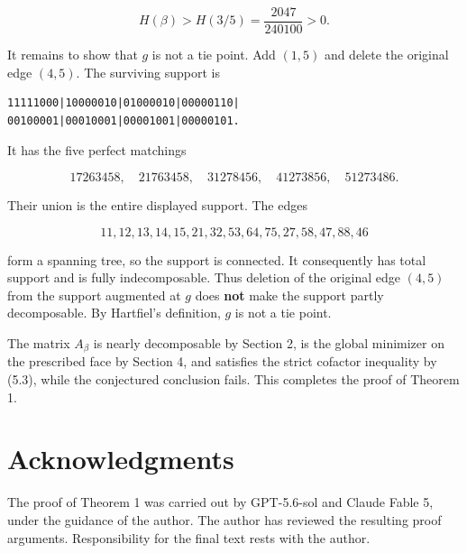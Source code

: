 \documentclass[11pt]{article}
\theoremstyle{definition}
\begin{document}
\[
H(\beta)>H(3/5)=\frac{2047}{240100}>0.                  \tag{5.3}
\]

It remains to show that \(g\) is not a tie point. Add \((1,5)\) and delete
the original edge \((4,5)\). The surviving support is

\begin{verbatim}
11111000|10000010|01000010|00000110|
00100001|00010001|00001001|00000101.
\end{verbatim}

It has the five perfect matchings

\[
17263458,\quad21763458,\quad31278456,\quad
41273856,\quad51273486.                                 \tag{5.4}
\]

Their union is the entire displayed support. The edges

\[
11,12,13,14,15,21,32,53,64,75,27,58,47,88,46            \tag{5.5}
\]

form a spanning tree, so the support is connected. It consequently has total
support and is fully indecomposable. Thus deletion of the original edge
\((4,5)\) from the support augmented at \(g\) does \textbf{not} make the support
partly decomposable. By Hartfiel's definition, \(g\) is not a tie point.

The matrix \(A_\beta\) is nearly decomposable by Section 2, is the global
minimizer on the prescribed face by Section 4, and satisfies the strict
cofactor inequality by (5.3), while the conjectured conclusion fails. This
completes the proof of Theorem 1.\hfill\qedsymbol

\section*{Acknowledgments}

The proof of Theorem 1 was carried out by GPT-5.6-sol and Claude Fable 5,
under the guidance of the author. The author has reviewed the resulting proof
arguments. Responsibility for the final text rests with the author.
\end{document}
